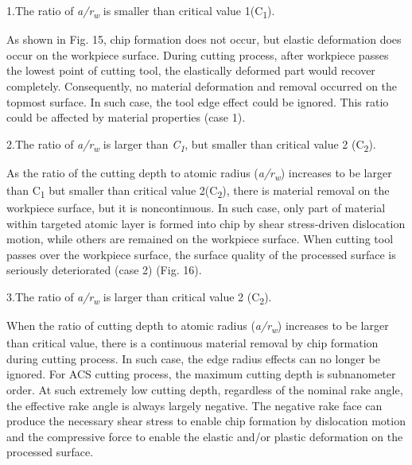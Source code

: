 \documentclass{article}
\begin{document}
\begin{hangpars}
1.\quad The ratio of \emph{a/r}\textsubscript{\emph{w}} is smaller than critical value 1(C\textsubscript{1}).
\end{hangpars}

As shown in Fig. 15, chip formation does not occur, but elastic deformation does occur on the workpiece surface. During cutting process, after workpiece passes the lowest point of cutting tool, the elastically deformed part would recover completely. Consequently, no material deformation and removal occurred on the topmost surface. In such case, the tool edge effect could be ignored. This ratio could be affected by material properties (case 1).

\begin{hangpars}
2.\quad The ratio of \emph{a/r}\textsubscript{\emph{w}} is larger than \emph{C}\textsubscript{\emph{1}}, but smaller than critical value 2 (C\textsubscript{2}).
\end{hangpars}

As the ratio of the cutting depth to atomic radius (\emph{a/r}\textsubscript{\emph{w}}) increases to be larger than C\textsubscript{1} but smaller than critical value 2(C\textsubscript{2}), there is material removal on the workpiece surface, but it is noncontinuous. In such case, only part of material within targeted atomic layer is formed into chip by shear stress-driven dislocation motion, while others are remained on the workpiece surface. When cutting tool passes over the workpiece surface, the surface quality of the processed surface is seriously deteriorated (case 2) (Fig. 16).

\begin{hangpars}
3.\quad The ratio of \emph{a/r}\textsubscript{\emph{w}} is larger than critical value 2 (C\textsubscript{2}).
\end{hangpars}

When the ratio of cutting depth to atomic radius (\emph{a/r}\textsubscript{\emph{w}}) increases to be larger than critical value, there is a continuous material removal by chip formation during cutting process. In such case, the edge radius effects can no longer be ignored. For ACS cutting process, the maximum cutting depth is subnanometer order. At such extremely low cutting depth, regardless of the nominal rake angle, the effective rake angle is always largely negative. The negative rake face can produce the necessary shear stress to enable chip formation by dislocation motion and the compressive force to enable the elastic and/or plastic deformation on the processed surface.
\end{document}
